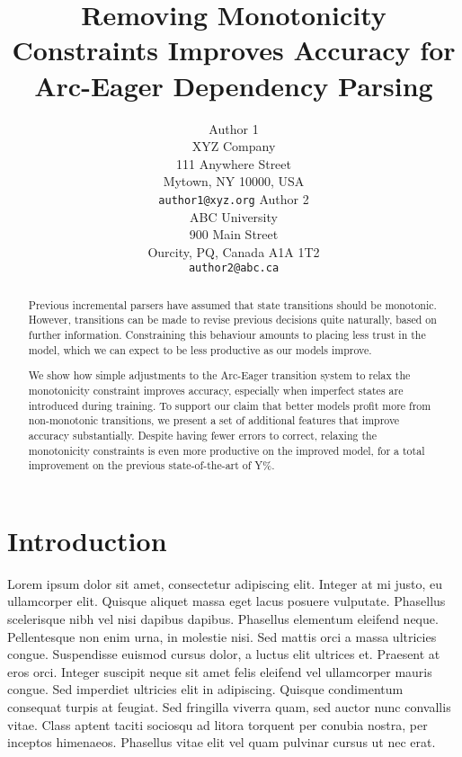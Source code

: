 \documentclass[11pt,letterpaper]{article}
\title{Removing Monotonicity Constraints Improves Accuracy for Arc-Eager Dependency Parsing}
\author{Author 1\\
	    XYZ Company\\
	    111 Anywhere Street\\
	    Mytown, NY 10000, USA\\
	    {\tt author1@xyz.org}
	  \And
	Author 2\\
  	ABC University\\
  	900 Main Street\\
  	Ourcity, PQ, Canada A1A 1T2\\
  {\tt author2@abc.ca}}
\date{}
\begin{document}
\maketitle
\begin{abstract}
    Previous incremental parsers have assumed that state transitions
    should be monotonic. However, transitions can be made to revise
    previous decisions quite naturally, based on further information.
    Constraining this behaviour amounts
    to placing less trust in the model, which we can expect to be less productive as
    our models improve.

    We show how simple adjustments to the Arc-Eager transition system to relax the
    monotonicity constraint improves accuracy, especially when imperfect
    states are introduced during training. To support our claim that better models
    profit more from non-monotonic transitions, we present a set of
    additional features that improve accuracy substantially. Despite having fewer errors
    to correct, relaxing the monotonicity constraints is even more productive on
    the improved model, for a total improvement on the previous state-of-the-art of
    Y\%.



\end{abstract}

\section{Introduction}
Lorem ipsum dolor sit amet, consectetur adipiscing elit. Integer at mi justo, eu ullamcorper elit. Quisque aliquet massa eget lacus posuere vulputate. Phasellus scelerisque nibh vel nisi dapibus dapibus. Phasellus elementum eleifend neque. Pellentesque non enim urna, in molestie nisi. Sed mattis orci a massa ultricies congue. Suspendisse euismod cursus dolor, a luctus elit ultrices et. Praesent at eros orci. Integer suscipit neque sit amet felis eleifend vel ullamcorper mauris congue. Sed imperdiet ultricies elit in adipiscing. Quisque condimentum consequat turpis at feugiat. Sed fringilla viverra quam, sed auctor nunc convallis vitae. Class aptent taciti sociosqu ad litora torquent per conubia nostra, per inceptos himenaeos. Phasellus vitae elit vel quam pulvinar cursus ut nec erat.
\end{document}
